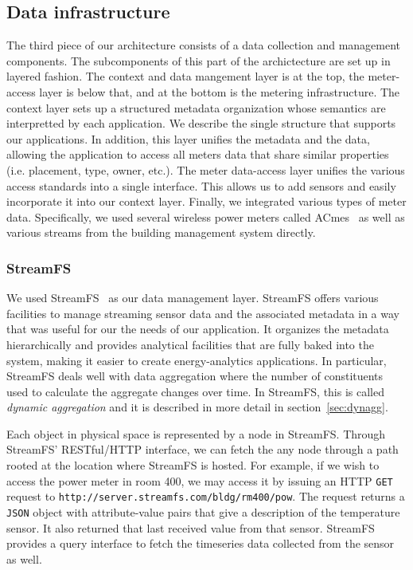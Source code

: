 \subsection{Data infrastructure}
The third piece of our architecture consists of a data collection and management components.  The subcomponents
of this part of the archictecture are set up in layered fashion.  The context and data mangement layer is at the top,
the meter-access layer is below that, and at the bottom is the metering infrastructure.  The context layer sets up
a structured metadata organization whose semantics are interpretted by each application.  We describe the single structure
that supports our applications.  In addition, this layer unifies the metadata and the data, allowing the application
to access all meters data that share similar properties (i.e. placement, type, owner, etc.).  The meter data-access layer 
unifies the various access standards into a single interface.  This allows us to add sensors and easily incorporate it
into our context layer.  Finally, we integrated various types of meter data.  Specifically, we used several wireless
power meters called ACmes~\cite{acme} as well as various streams from the building management system directly.

\subsubsection{StreamFS}
\label{sec:streamfs}
We used StreamFS~\cite{streamfs} as our data management layer.  StreamFS offers various
facilities to manage streaming sensor data and the associated metadata in a way that was useful for our the needs
of our application.  It organizes the metadata hierarchically and provides analytical
facilities that are fully baked into the system, making it easier to create energy-analytics applications.  In particular,
StreamFS deals well with data aggregation where the number of constituents used to calculate the aggregate
changes over time.  In StreamFS, this is called \emph{dynamic aggregation} and it is described in more detail
in section~\ref{sec:dynagg}.

Each object in physical space is represented by a node in StreamFS.  Through StreamFS' RESTful/HTTP interface, we can
fetch the any node through a path rooted at the location where StreamFS is hosted.  For example, if we wish
to access the power meter in room 400, we may access it by issuing an HTTP {\tt GET} request to
{\tt http://server.streamfs.com/bldg/rm400/pow}.  The request returns a {\tt JSON} object with attribute-value
pairs that give a description of the temperature sensor.  It also returned that last received value from that sensor.
StreamFS provides a query interface to fetch the timeseries data collected from the sensor as well.

